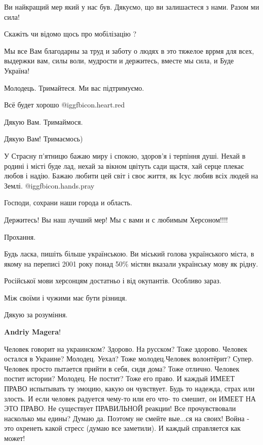\begin{itemize}
Ви найкращий мер який у нас був. Дякуємо, що ви залишаєтеся з нами. Разом ми сила!

Скажіть чи відомо щось про мобілізацію ?


Мы все Вам благодарны за труд и заботу о людях в это тяжелое вррмя для всех,
выдержки вам, силы воли, мудрости и держитесь, вместе мы сила, и Буде Україна!

Молодець. Тримайтеся. Ми вас підтримуємо.

Всё будет хорошо @igg{fbicon.heart.red}

Дякую Вам. Тримаймося.

Дякую Вам! Тримаємось)


У Страсну п'ятницю бажаю миру і спокою, здоров'я і терпіння душі. Нехай в
родині і місті буде лад, нехай за вікном цвітуть сади щастя, хай серце плекає
любов і надію. Бажаю любити цей світ і своє життя, як Ісус любив всіх людей на
Землі. @igg{fbicon.hands.pray} 

Господи, сохрани наши города и область.

Держитесь! Вы наш лучший мер! Мы с вами и с любимым Херсоном!!!!


Прохання.

Будь ласка, пишіть більше українською. Ви міський голова українського міста, в
якому на переписі 2001 року понад 50\% містян вказали українську мову як рідну.

Російської мови херсонцям достатньо і від окупантів. Особливо зараз.

Між своїми і чужими має бути різниця.

Дякую за розуміння.

\begin{itemize} %
\textbf{Andriy Magera}!

Человек говорит на украинском? Здорово. На русском? Тоже здорово. Человек
остался в Украине? Молодец. Уехал? Тоже молодец.Человек волонтёрит? Супер.
Человек просто пытается прийти в себя, сидя дома? Тоже отлично. Человек постит
истории? Молодец. Не постит? Тоже его право. И каждый ИМЕЕТ ПРАВО испытывать ту
эмоцию, какую он чувствует. Будь то надежда, страх или злость. И если человек
радуется чему-то или его что- то смешит, он ИМЕЕТ НА ЭТО ПРАВО. Не существует
ПРАВИЛЬНОЙ реакции! Все прочувствовали насколько мы едины? Думаю да. Поэтому не
смейте вые...ся на своих! Война - это охренеть какой стресс (думаю все
заметили). И каждый справляется как может!


\end{itemize}
\end{itemize}
